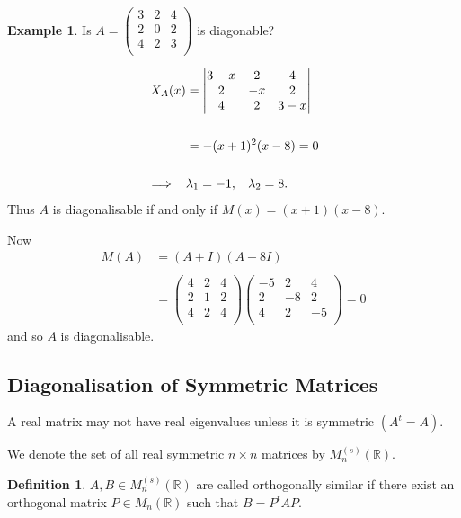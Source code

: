 \documentclass[11pt,a4paper]{article}
\theoremstyle{definition}
\newtheorem{defn}[thm]{Definition}
\newtheorem{exa}[thm]{Example}
\begin{document}
\begin{exa}
Is $A=
\begin{pmatrix}
3&2&4\\2&0&2\\4&2&3\\
\end{pmatrix}
$ is diagonable?

\begin{align*}
X_A(x) &=
\begin{vmatrix}
3-x&2&4\\2&-x&2\\4&2&3-x\\
\end{vmatrix}\\\\
&=-(x+1)^2(x-8)=0\\\\
\implies\hspace{0.3cm} &\lambda_1=-1,\hspace{0.3cm}\lambda_2=8.
\end{align*}
Thus $A$ is diagonalisable if and only if $M(x)=(x+1)(x-8)$.

Now
\begin{align*}
M(A) &=(A+I)(A-8I)\\\\
&=\begin{pmatrix}
4&2&4\\2&1&2\\4&2&4\\
\end{pmatrix}
\begin{pmatrix}
-5&2&4\\2&-8&2\\4&2&-5\\
\end{pmatrix}
=0
\end{align*}
and so $A$ is diagonalisable.
\end{exa}


\subsection{Diagonalisation of Symmetric Matrices}
A real matrix may not have real eigenvalues unless it is symmetric $(A^t=A)$.

We denote the set of all real symmetric $n\times n$ matrices by $M^{(s)}_n(\mathbb{R})$.


\begin{defn}
$A,B\in M^{(s)}_n(\mathbb{R})$ are called orthogonally similar if there exist an orthogonal matrix $P\in M_n(\mathbb{R})$ such that $B=P^tAP$.
\end{defn}
\end{document}
